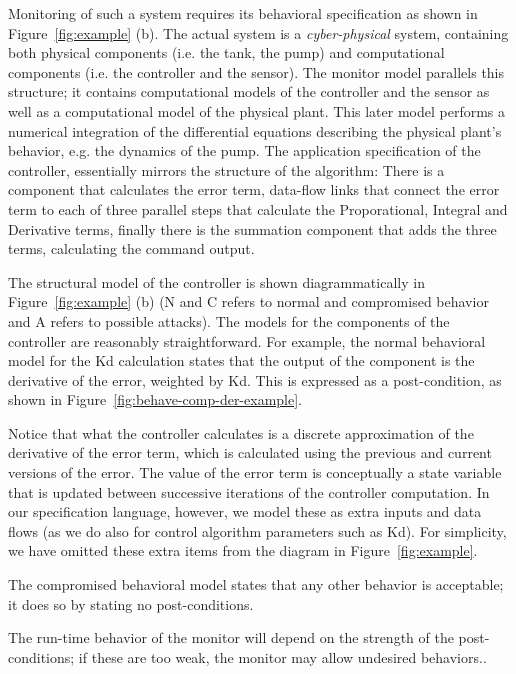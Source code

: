 \documentclass[conference]{IEEEtran}
\begin{document}
Monitoring of such a system requires its behavioral specification as shown in Figure~\ref{fig:example} (b). The actual system is a {\em cyber-physical} system, containing both physical components (i.e. the tank, the pump) and computational components (i.e. the controller and the sensor). The monitor model parallels this structure; it contains computational models of the controller and the sensor as well as a computational model of the physical plant. This later model performs a numerical integration of the differential equations describing the physical plant's behavior, e.g. the dynamics of the pump. 
The application specification of the controller, essentially mirrors the structure of the algorithm: There is a component that calculates the error term, data-flow links that connect the error term to each of three parallel steps that calculate the Proporational, Integral and Derivative terms, finally there is the summation component that adds the three terms, calculating the command output.



The structural model of the controller is shown diagrammatically in
Figure~\ref{fig:example} (b) (N and C refers to normal and compromised behavior and A
refers to possible attacks).  The models for the components of the
controller are reasonably straightforward. For example, the normal
behavioral model for the Kd calculation states that the output of the
component is the derivative of the error, weighted by Kd.  This is
expressed as a post-condition, as shown in Figure~\ref{fig:behave-comp-der-example}.

Notice that what the controller calculates is a discrete approximation of the derivative of
the error term, which is calculated using the previous and current
versions of the error.  The value of the error term is conceptually a
state variable that is updated between successive iterations of
the controller computation.  In our specification language, however,
we model these as extra inputs and data flows  (as we do also for control algorithm parameters
such as Kd).  For simplicity, we have omitted these extra items from the diagram
in Figure~\ref{fig:example}.

The compromised behavioral model states that any other
behavior is acceptable; it does so by stating no post-conditions.

The run-time behavior of the monitor will depend
on the strength of the post-conditions; if these are
too weak, the monitor may allow undesired behaviors..
\end{document}
